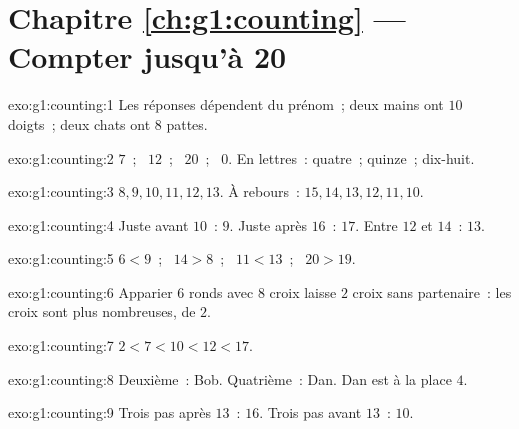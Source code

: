 \section*{Chapitre \ref{ch:g1:counting} --- Compter jusqu'à 20}

\begin{solution}{exo:g1:counting:1}
Les réponses dépendent du prénom~; deux mains ont $10$ doigts~;
deux chats ont $8$ pattes.
\end{solution}

\begin{solution}{exo:g1:counting:2}
$7$~; \ $12$~; \ $20$~; \ $0$. En lettres~: quatre~; quinze~;
dix-huit.
\end{solution}

\begin{solution}{exo:g1:counting:3}
$8, 9, 10, 11, 12, 13$. À rebours~: $15, 14, 13, 12, 11, 10$.
\end{solution}

\begin{solution}{exo:g1:counting:4}
Juste avant $10$~: $9$. Juste après $16$~: $17$. Entre $12$ et
$14$~: $13$.
\end{solution}

\begin{solution}{exo:g1:counting:5}
$6 < 9$~; \ $14 > 8$~; \ $11 < 13$~; \ $20 > 19$.
\end{solution}

\begin{solution}{exo:g1:counting:6}
Apparier $6$ ronds avec $8$ croix laisse $2$ croix sans partenaire~:
les croix sont plus nombreuses, de $2$.
\end{solution}

\begin{solution}{exo:g1:counting:7}
$2 < 7 < 10 < 12 < 17$.
\end{solution}

\begin{solution}{exo:g1:counting:8}
Deuxième~: Bob. Quatrième~: Dan. Dan est à la place $4$.
\end{solution}

\begin{solution}{exo:g1:counting:9}
Trois pas après $13$~: $16$. Trois pas avant $13$~: $10$.
\end{solution}
